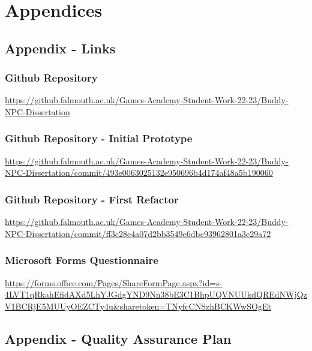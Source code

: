 \documentclass{IEEEtran}
\begin{document}
 \newpage

\onecolumn
\section{Appendices}
\label{Appendices}

\subsection{Appendix - Links}
\label{AppendixLinks}

\subsubsection{Github Repository}
\label{GitRepo}
\url{https://github.falmouth.ac.uk/Games-Academy-Student-Work-22-23/Buddy-NPC-Dissertation}

\subsubsection{Github Repository - Initial Prototype}
\label{GitRepo-InitialPrototype}
\url{https://github.falmouth.ac.uk/Games-Academy-Student-Work-22-23/Buddy-NPC-Dissertation/commit/493e0063025132e950696b4d174af48a5b190060}

\subsubsection{Github Repository - First Refactor}
\label{GitRepo-FirstRefactor}
\url{https://github.falmouth.ac.uk/Games-Academy-Student-Work-22-23/Buddy-NPC-Dissertation/commit/ff3c28e4a07d2bb3549c6dbc93962801a3e29a72}

\subsubsection{Microsoft Forms Questionnaire}
\label{QuestionnaireForm}
\url{https://forms.office.com/Pages/ShareFormPage.aspx?id=s-4LVT1qRkahEfidAXd5LhYJGdgYND9Nn38bE3C1BhpUQVNUUkdQREdNWjQzV1BCRjE5MUUyOEZCTy4u&sharetoken=TNyfcCNSzhBCKWwSOgEt}

\subsection{Appendix - Quality Assurance Plan}
\label{AppendixQAPlan}
\end{document}
